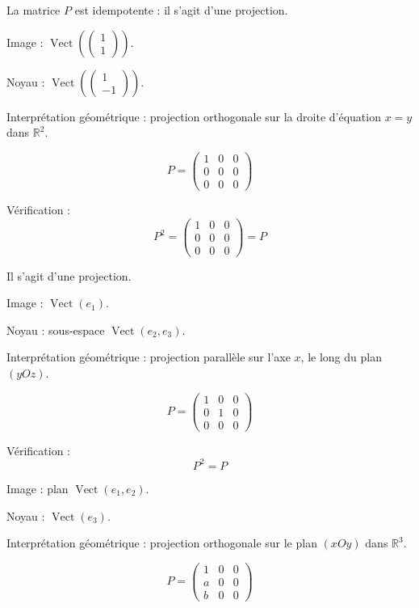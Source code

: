 \documentclass[10pt,a4paper]{article}
\begin{document}
La matrice $P$ est idempotente : il s'agit d'une projection.

Image : $\operatorname{Vect}\left(\begin{pmatrix}1\\1\end{pmatrix}\right)$.

Noyau : $\operatorname{Vect}\left(\begin{pmatrix}1\\-1\end{pmatrix}\right)$.

Interprétation géométrique : projection orthogonale sur la droite d'équation $x = y$ dans $\mathbb{R}^2$.

\[
P =
\begin{pmatrix}
1 & 0 & 0\\
0 & 0 & 0\\
0 & 0 & 0
\end{pmatrix}
\]

Vérification :
\[
P^2 =
\begin{pmatrix}
1 & 0 & 0\\
0 & 0 & 0\\
0 & 0 & 0
\end{pmatrix}
= P
\]

Il s'agit d'une projection.

Image : $\operatorname{Vect}(e_1)$.

Noyau : sous-espace $\operatorname{Vect}(e_2, e_3)$.

Interprétation géométrique : projection parallèle sur l'axe $x$, le long du plan $(yOz)$.

\[
P =
\begin{pmatrix}
1 & 0 & 0\\
0 & 1 & 0\\
0 & 0 & 0
\end{pmatrix}
\]

Vérification :
\[
P^2 = P
\]

Image : plan $\operatorname{Vect}(e_1, e_2)$.

Noyau : $\operatorname{Vect}(e_3)$.

Interprétation géométrique : projection orthogonale sur le plan $(xOy)$ dans $\mathbb{R}^3$.

\[
P =
\begin{pmatrix}
1 & 0 & 0\\
a & 0 & 0\\
b & 0 & 0
\end{pmatrix}
\]
\end{document}
